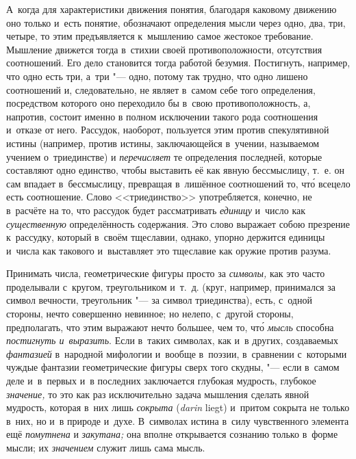 А~когда для характеристики движения понятия, благодаря каковому движению оно
только и~есть понятие, обозначают определения мысли через одно, два, три,
четыре, то этим предъявляется к~мышлению самое жестокое требование. Мышление
движется тогда в~стихии своей противоположности, отсутствия соотношений. Его
дело становится тогда работой безумия. Постигнуть, например, что одно есть три,
а~три "--- одно, потому так трудно, что одно лишено соотношений и,
следовательно, не являет в~самом себе того определения, посредством которого
оно переходило бы в~свою противоположность, а, напротив, состоит именно в
полном исключении такого рода соотношения и~отказе от него. Рассудок, наоборот,
пользуется этим против спекулятивной истины (например, против истины,
заключающейся в~учении, называемом учением о~триединстве) и {\em перечисляет}
те определения последней, которые составляют одно единство, чтобы выставить её
как явную бессмыслицу, т.~е. он сам впадает в~бессмыслицу, превращая в~лишённое
соотношений то, чт\'{о} всецело есть соотношение. Слово <<триединство>>
употребляется, конечно, не в~расчёте на то, что рассудок будет рассматривать
{\em единицу} и~число как {\em существенную} определённость содержания. Это слово
выражает собою презрение к~рассудку, который в~своём тщеславии, однако, упорно
держится единицы и~числа как такового и~выставляет это тщеславие как оружие
против разума.

Принимать числа, геометрические фигуры просто за {\em символы,} как это часто
проделывали с~кругом, треугольником и~т.~д. (круг, например, принимался за
символ вечности, треугольник "--- за символ триединства), есть, с~одной
стороны, нечто совершенно невинное; но нелепо, с~другой стороны, предполагать,
что этим выражают нечто большее, чем то, чт\'{о} {\em мысль} способна
{\em постигнуть и~выразить}. Если в~таких символах, как и~в других, создаваемых
{\em фантазией} в~народной мифологии и~вообще в~поэзии, в~сравнении с~которыми
чуждые фантазии геометрические фигуры сверх того скудны, "--- если в~самом деле
и~в~первых и~в последних заключается глубокая мудрость, глубокое
{\em значение,} то это как раз исключительно задача мышления сделать явной мудрость,
которая в~них лишь {\em сокрыта} ({\em \!darin} liegt) и~притом сокрыта не только
в~них, но и~в природе и~духе. В~символах истина в~силу чувственного элемента
ещё {\em помутнена} и {\em закутана;} она вполне открывается сознанию только
в~форме мысли; их {\em значением} служит лишь сама мысль.

